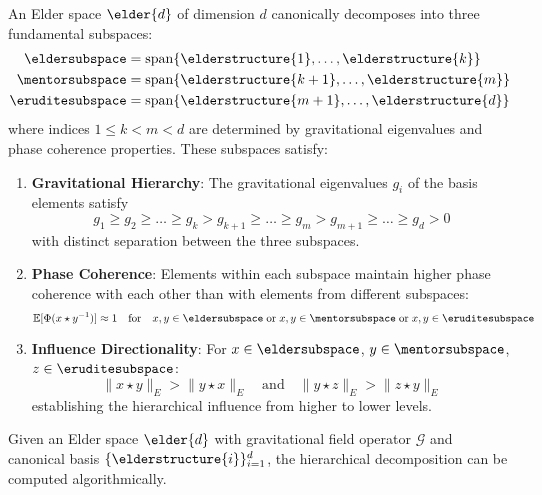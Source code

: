 \begin{definition}
An Elder space $\elder{d}$ of dimension $d$ canonically decomposes into three fundamental subspaces:
\begin{align}
    \eldersubspace &= \mathrm{span}\{\elderstructure{1}, \ldots, \elderstructure{k}\} \\
    \mentorsubspace &= \mathrm{span}\{\elderstructure{k+1}, \ldots, \elderstructure{m}\} \\
    \eruditesubspace &= \mathrm{span}\{\elderstructure{m+1}, \ldots, \elderstructure{d}\}
\end{align}
where indices $1 \leq k < m < d$ are determined by gravitational eigenvalues and phase coherence properties. These subspaces satisfy:

\begin{enumerate}
    \item \textbf{Gravitational Hierarchy}: The gravitational eigenvalues $g_i$ of the basis elements satisfy
    \begin{equation}
    g_1 \geq g_2 \geq \ldots \geq g_k > g_{k+1} \geq \ldots \geq g_m > g_{m+1} \geq \ldots \geq g_d > 0
    \end{equation}
    with distinct separation between the three subspaces.
    
    \item \textbf{Phase Coherence}: Elements within each subspace maintain higher phase coherence with each other than with elements from different subspaces:
    \begin{equation}
    \mathbb{E}[\Phi(x \star y^{-1})] \approx 1 \quad \text{for} \quad x,y \in \eldersubspace \; \text{or} \; x,y \in \mentorsubspace \; \text{or} \; x,y \in \eruditesubspace
    \end{equation}
    
    \item \textbf{Influence Directionality}: For $x \in \eldersubspace$, $y \in \mentorsubspace$, $z \in \eruditesubspace$:
    \begin{equation}
    \|x \star y\|_E > \|y \star x\|_E \quad \text{and} \quad \|y \star z\|_E > \|z \star y\|_E
    \end{equation}
    establishing the hierarchical influence from higher to lower levels.
\end{enumerate}
\end{definition}

\begin{theorem}
\label{thm:hierarchical_decomposition_algorithm}
Given an Elder space $\elder{d}$ with gravitational field operator $\mathcal{G}$ and canonical basis $\{\elderstructure{i}\}_{i=1}^{d}$, the hierarchical decomposition can be computed algorithmically.
\end{theorem}

